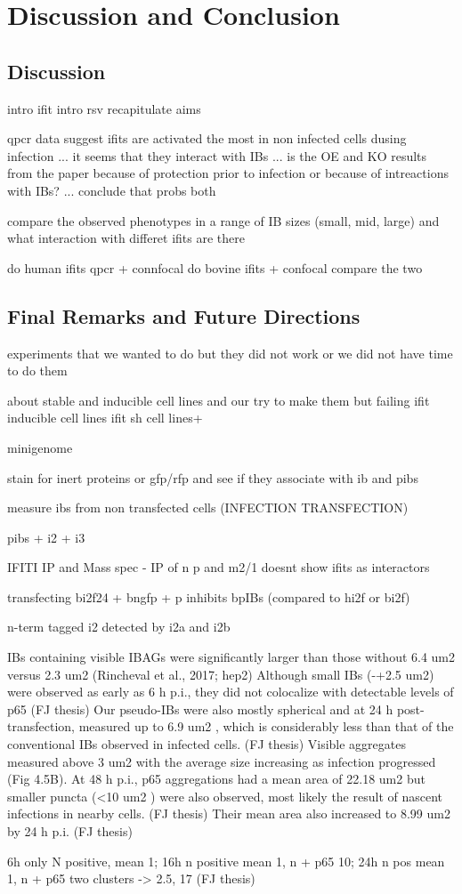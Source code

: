 \chapter{Discussion and Conclusion}
\section{Discussion}

intro ifit
intro rsv
recapitulate aims

qpcr data suggest ifits are activated the most in non infected cells dusing infection ... it seems that they interact with IBs ... is the OE and KO results from the paper because of protection prior to infection or because of intreactions with IBs? ... conclude that probs both


compare the observed phenotypes in a range of IB sizes (small, mid, large) and what interaction with differet ifits are there

do human ifits qpcr + connfocal
do bovine ifits  + confocal
compare the two


\section{Final Remarks and Future Directions}
experiments that we wanted to do but they did not work or we did not have time to do them


about stable and inducible cell lines and our try to make them but failing
ifit inducible cell lines
ifit sh cell lines+

minigenome

stain for inert proteins or gfp/rfp and see if they associate with ib and pibs

measure ibs from non transfected cells (INFECTION TRANSFECTION)


pibs + i2 + i3

IFITI IP and Mass spec
\cite{Oliveira2013HumanCells} - IP of n p and m2/1 doesnt show ifits as interactors

transfecting bi2f24 + bngfp + p inhibits bpIBs (compared to hi2f or bi2f)

n-term tagged i2 detected by i2a and i2b


IBs containing visible IBAGs were significantly larger than those without 6.4 um2 versus 2.3 um2 (Rincheval et al., 2017; hep2)
Although small IBs (-+2.5 um2) were observed as early as 6 h p.i., they did not colocalize with detectable levels of p65 (FJ thesis)
Our pseudo-IBs were also mostly spherical and at 24 h post-transfection, measured up to 6.9 um2 , which is considerably less than that of the conventional IBs observed in infected cells. (FJ thesis)
Visible aggregates measured above 3 um2 with the average size increasing as infection progressed (Fig 4.5B). At 48 h p.i., p65 aggregations had a mean area of 22.18 um2 but smaller puncta (<10 um2 ) were also observed, most likely the result of nascent infections in nearby cells. (FJ thesis)
Their mean area also increased to 8.99 um2 by 24 h p.i. (FJ thesis)

6h only N positive, mean 1; 16h n positive mean 1, n + p65 10; 24h n pos mean 1, n + p65 two clusters -> 2.5, 17 (FJ thesis)